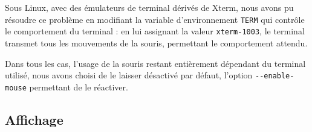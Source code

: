 \documentclass[11pt,a4paper]{article}
\begin{document}
Sous Linux, avec des émulateurs de terminal dérivés de Xterm, nous avons pu résoudre ce problème en modifiant la variable d'environnement \verb"TERM" qui contrôle le comportement du terminal : en lui assignant la valeur \verb"xterm-1003", le terminal transmet tous les mouvements de la souris, permettant le comportement attendu.

Dans tous les cas, l'usage de la souris restant entièrement dépendant du terminal utilisé, nous avons choisi de le laisser désactivé par défaut, l'option \verb"--enable-mouse" permettant de le réactiver.

\subsection{Affichage}
\end{document}
